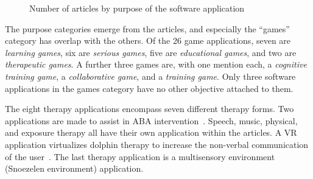 \documentclass[utf8,english]{gradu3}
\begin{document}
\begin{figure}[thb]
  \centering
  \caption{Number of articles by purpose of the software application}
  \label{kuvaTarkoitukset}
\end{figure}

The purpose categories emerge from the articles, and especially the ``games'' category has overlap with the others.
Of the 26 game applications, seven are \textit{learning games}, six are \textit{serious games},
five are \textit{educational games}, and two are \textit{therapeutic games}.
A further three games are, with one mention each, a \textit{cognitive training game},
a \textit{collaborative game}, and a \textit{training game}.
Only three software applications in the games category have no other objective attached to them.

The eight therapy applications encompass seven different therapy forms.
Two applications are made to assist in ABA intervention~\parencite{artoni2013portable, artoni2018technology}.
Speech, music, physical, and exposure therapy all have their own application within the articles.
A VR application virtualizes dolphin therapy to increase the non-verbal communication of the user~\parencite{cai2013}.
The last therapy application is a multisensory environment (Snoezelen environment) application.
\end{document}
